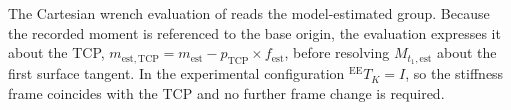 The Cartesian wrench evaluation of
\mbox{} reads the model-estimated group.
Because the recorded moment is referenced to the base origin, the evaluation
expresses it about the TCP,
\mbox{\(m_{\mathrm{est,TCP}}=m_{\mathrm{est}}-p_{\mathrm{TCP}}\times
f_{\mathrm{est}}\)}, before resolving \mbox{\(M_{t_1,\mathrm{est}}\)} about the
first surface tangent. In the experimental configuration
\mbox{\({}^{\mathrm{EE}}T_K=I\)}, so the stiffness frame coincides with the TCP
and no further frame change is required.
